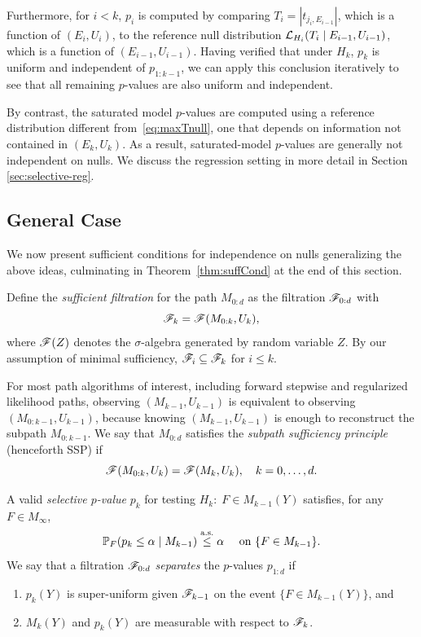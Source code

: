 \documentclass{article}
\begin{document}
Furthermore, for $i<k$, $p_i$ is computed by comparing $T_i=|t_{j_i, E_{i-1}}|$, which is a function of $(E_i, U_i)$, to the reference null distribution $\mathcal{L}_{H_i}(T_i \mid E_{i-1}, U_{i-1})$, which is a function of $(E_{i-1}, U_{i-1})$. Having verified that under $H_k$, $p_k$ is uniform and independent of $p_{1:{k-1}}$, we can apply this conclusion iteratively to see that all remaining $p$-values are also uniform and independent.

By contrast, the saturated model $p$-values are computed using a reference distribution different from~\eqref{eq:maxTnull}, one that depends on
information not contained in $(E_k,U_k)$. As a result, saturated-model $p$-values are generally not independent on nulls. We discuss the regression setting in more detail in Section \ref{sec:selective-reg}.

\subsection{General Case}


We now present sufficient conditions for independence on nulls generalizing the above ideas, culminating in Theorem~\ref{thm:suffCond} at the end of this section.

Define the {\em sufficient filtration} for the path $M_{0:d}$ as the filtration $\mathscr{F}_{0:d}$ with 
\[
\mathscr{F}_k = \mathscr{F}(M_{0:k}, U_k),
\]
where $\mathscr{F}(Z)$ denotes the $\sigma$-algebra generated by random variable $Z$. By our assumption of minimal sufficiency, $\mathscr{F}_i \subseteq \mathscr{F}_k$ for $i\leq k$.

For most path algorithms of interest, including forward stepwise and regularized likelihood paths, observing $(M_{k-1}, U_{k-1})$ is equivalent to observing $(M_{0:k-1},U_{k-1})$, because knowing $(M_{k-1}, U_{k-1})$ is enough to  reconstruct the subpath $M_{0:k-1}$. We say that $M_{0:d}$ satisfies the {\em subpath sufficiency principle} (henceforth SSP) if \begin{equation}\label{eq:SSP}
  \mathscr{F}(M_{0:k}, U_k) = \mathscr{F}(M_k, U_k), \quad k=0,\ldots, d.
\end{equation}

A valid {\em selective $p$-value} $p_k$ for testing $H_k:\; F \in M_{k-1}(Y)$ satisfies, for any $F\in M_{\infty}$,
\[
\mathbb{P}_F(p_k \leq \alpha \mid M_{k-1}) \overset{\textrm{a.s.}}{\leq} \alpha \quad \text{ on } \{F\in M_{k-1}\}.
\]
We say that a filtration $\mathscr{F}_{0:d}$ {\em separates} the $p$-values $p_{1:d}$ if
\begin{enumerate}
\item $p_k(Y)$ is super-uniform given $\mathscr{F}_{k-1}$ on the event $\{F\in M_{k-1}(Y)\}$, and
\item $M_k(Y)$ and $p_k(Y)$ are measurable with respect to $\mathscr{F}_k$.
\end{enumerate}
\end{document}
